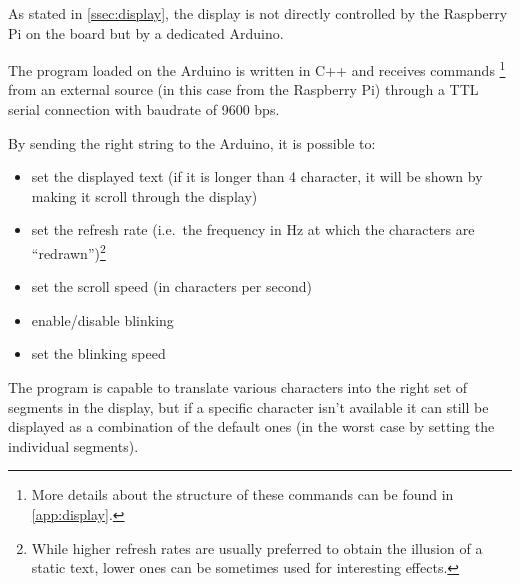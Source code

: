 As stated in \autoref{ssec:display}, the display is not directly controlled by
the Raspberry Pi on the board but by a dedicated Arduino.

The program loaded on the Arduino is written in C++ and receives commands%
\footnote{More details about the structure of these commands can be found in
\autoref{app:display}.} from an external source (in this case from the Raspberry
Pi) through a TTL serial connection with baudrate of 9600 bps.

\beforelist By sending the right string to the Arduino, it is possible to:
\begin{itemize}
\item set the displayed text (if it is longer than 4 character, it will be
  shown by making it scroll through the display)
\item set the refresh rate (i.e.\ the frequency in Hz at which the characters
  are ``redrawn'')\footnote{While higher refresh rates are usually preferred to
  obtain the illusion of a static text, lower ones can be sometimes used for
  interesting effects.}
\item set the scroll speed (in characters per second)
\item enable/disable blinking
\item set the blinking speed
\end{itemize}
\afterlist*
The program is capable to translate various characters into the right set of
segments in the display, but if a specific character isn't available it can
still be displayed as a combination of the default ones (in the worst case by
setting the individual segments).
